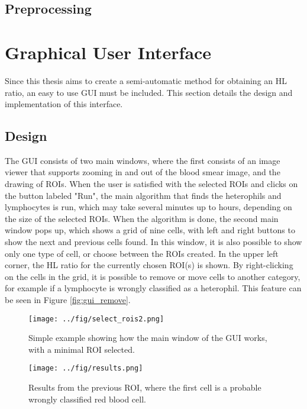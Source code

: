 \subsection{Preprocessing}\label{sec:research:history}

\section{Graphical User Interface}
Since this thesis aims to create a semi-automatic method for obtaining an HL ratio, an easy to use GUI must be included. This section details the design and implementation of this interface.

\subsection{Design}
The GUI consists of two main windows, where the first consists of an image viewer that supports zooming in and out of the blood smear image, and the drawing of ROIs. When the user is satisfied with the selected ROIs and clicks on the button labeled "Run", the main algorithm that finds the heterophils and lymphocytes is run, which may take several minutes up to hours, depending on the size of the selected ROIs. When the algorithm is done, the second main window pops up, which shows a grid of nine cells, with left and right buttons to show the next and previous cells found. In this window, it is also possible to show only one type of cell, or choose between the ROIs created. In the upper left corner, the HL ratio for the currently chosen ROI(s) is shown. By right-clicking on the cells in the grid, it is possible to remove or move cells to another category, for example if a lymphocyte is wrongly classified as a heterophil. This feature can be seen in Figure \ref{fig:gui_remove}.

\begin{figure}[h!]
    \centering
    \texttt{[image: ../fig/select\_rois2.png]}
    \caption{Simple example showing how the main window of the GUI works, with a minimal ROI selected.}
    \label{fig:gui_main}
\end{figure}

\begin{figure}[h!]
    \centering
    \texttt{[image: ../fig/results.png]}
    \caption{Results from the previous ROI, where the first cell is a probable wrongly classified red blood cell.}
    \label{fig:gui_results}
\end{figure}

